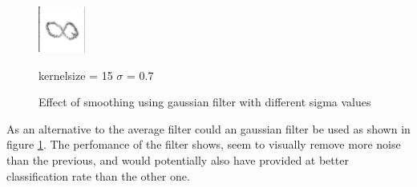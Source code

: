 \begin{figure}[H]
\begin{minipage}[t]{0.30\textwidth}
		\centering
			\includegraphics[width=0.4\linewidth]{Figure/mikael_8_2_dpi300_k15_sig_07.png}
			\caption{kernelsize = 15 $\sigma$ = 0.7}
			\label{fig:fig:dpi_300_k_9_s_0.7}
	\end{minipage}
\caption{Effect of smoothing using gaussian filter with different sigma values}
\label{fig:gaussian_filter}
\end{figure}

As an alternative to the average filter could an gaussian filter be used as shown
 in figure \ref{fig:gaussian_filter}. 
 The perfomance of the filter shows, seem to visually remove more noise than the previous,
 and would potentially also have provided at better classification rate than the other one. 



